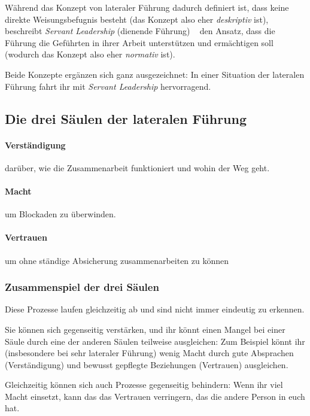 Während das Konzept von lateraler Führung dadurch definiert ist, dass keine direkte Weisungsbefugnis besteht (das Konzept also eher \emph{deskriptiv} ist), beschreibt \emph{Servant Leadership} (\glqq dienende Führung\grqq) ~\cite{fuehren-durch-dienen} den Ansatz, dass die Führung die Geführten in ihrer Arbeit unterstützen und ermächtigen soll (wodurch das Konzept also eher \emph{normativ} ist).

Beide Konzepte ergänzen sich ganz ausgezeichnet: In einer Situation der lateralen Führung fahrt ihr mit \emph{Servant Leadership} hervorragend.

\subsection{Die drei Säulen der lateralen Führung}

\paragraph{Verständigung} darüber, wie die Zusammenarbeit funktioniert und wohin der Weg geht.


\paragraph{Macht} um Blockaden zu überwinden.


\paragraph{Vertrauen} um ohne ständige Absicherung zusammenarbeiten zu können

\subsubsection{Zusammenspiel der drei Säulen}

Diese Prozesse laufen gleichzeitig ab und sind nicht immer eindeutig zu erkennen.

Sie können sich gegenseitig verstärken, und ihr könnt einen Mangel bei einer Säule durch eine der anderen Säulen teilweise ausgleichen: Zum Beispiel könnt ihr (insbesondere bei sehr lateraler Führung) wenig Macht durch gute Absprachen (Verständigung) und bewusst gepflegte Beziehungen (Vertrauen) ausgleichen.

Gleichzeitig können sich auch Prozesse gegenseitig behindern: Wenn ihr viel Macht einsetzt, kann das das Vertrauen verringern, das die andere Person in euch hat.

